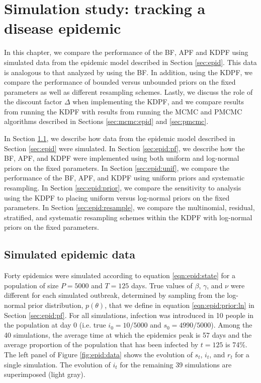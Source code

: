 \chapter{Simulation study: tracking a disease epidemic \label{ch:epid}}

In this chapter, we compare the performance of the BF, APF and KDPF using simulated data from the epidemic model described in Section \ref{sec:epid}. This data is analogous to that analyzed by \citet{skvortsov2012monitoring} using the BF. In addition, using the KDPF, we compare the performance of bounded versus unbounded priors on the fixed parameters as well as different resampling schemes. Lastly, we discuss the role of the discount factor $\Delta$ when implementing the KDPF, and we compare results from running the KDPF with results from running the MCMC and PMCMC algorithms described in Sections \ref{sec:mcmc:epid} and \ref{sec:pmcmc}.

In Section \ref{sec:epid:sim}, we describe how data from the epidemic model described in Section \ref{sec:epid} were simulated. In Section \ref{sec:epid:pf}, we describe how the BF, APF, and KDPF were implemented using both uniform and log-normal priors on the fixed parameters. In Section \ref{sec:epid:unif}, we compare the performance of the BF, APF, and KDPF using uniform priors and systematic resampling. In Section \ref{sec:epid:prior}, we compare the sensitivity to analysis using the KDPF to placing uniform versus log-normal priors on the fixed parameters. In Section \ref{sec:epid:resample}, we compare the multinomial, residual, stratified, and systematic resampling schemes within the KDPF with log-normal priors on the fixed parameters.

\section{Simulated epidemic data} \label{sec:epid:sim}

Forty epidemics were simulated according to equation \eqref{eqn:epid:state} for a population of size $P = 5000$ and $T = 125$ days. True values of $\beta$, $\gamma$, and $\nu$ were different for each simulated outbreak, determined by sampling from the log-normal prior distribution, $p(\theta)$, that we define in equation \eqref{eqn:epid:prior:ln} in Section \ref{sec:epid:pf}. For all simulations, infection was introduced in 10 people in the population at day 0 (i.e. true $i_0 = 10/5000$ and $s_0 = 4990/5000$). Among the 40 simulations, the average time at which the epidemics peak is 57 days and the average proportion of the population that has been infected by $t = 125$ is 74\%. The left panel of Figure \ref{fig:epid:data} shows the evolution of $s_t$, $i_t$, and $r_t$ for a single simulation. The evolution of $i_t$ for the remaining 39 simulations are superimposed (light gray).

